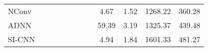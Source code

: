 \documentclass[letterpaper, 10 pt, conference]{ieeeconf}  \usepackage{geometry}
\begin{document}
\begin{table*}[t]
{\begin{tabular}{@{}lccccccccccc@{}}
			\multicolumn{1}{l|}{NConv \cite{Confidence_Original}}                            & \multicolumn{1}{c|}{}                                                           & \multicolumn{1}{c|}{\checkmark}                                                              & \multicolumn{1}{c|}{}                                                            & \multicolumn{1}{c|}{\checkmark}              & \multicolumn{1}{c|}{}                 & \multicolumn{1}{c|}{}                                                                 & \multicolumn{1}{c|}{}                                                                   & 4.67                                                                                 & 1.52                                                                                & 1268.22                                                                           & 360.28                                                      \\
			\multicolumn{1}{l|}{ADNN \cite{ADNN}}                             & \multicolumn{1}{c|}{}                                                           & \multicolumn{1}{c|}{}                                                                 & \multicolumn{1}{c|}{\checkmark}                                                         & \multicolumn{1}{c|}{}                 & \multicolumn{1}{c|}{}                 & \multicolumn{1}{c|}{}                                                                 & \multicolumn{1}{c|}{}                                                                   & 59.39                                                                                & 3.19                                                                                & 1325.37                                                                           & 439.48                                                      \\
			\multicolumn{1}{l|}{SI-CNN \cite{uhrig2017sparsity}}                           & \multicolumn{1}{c|}{}                                                           & \multicolumn{1}{c|}{}                                                                 & \multicolumn{1}{c|}{\checkmark}                                                         & \multicolumn{1}{c|}{}                 & \multicolumn{1}{c|}{}                 & \multicolumn{1}{c|}{}                                                                 & \multicolumn{1}{c|}{}                                                                   & 4.94                                                                                 & 1.84                                                                                & 1601.33                                                                           & 481.27                                                      \\ \bottomrule
		\end{tabular}
	}
	\label{Tb:Kap4:Kitti-rankings}
\end{table*}
\end{document}
